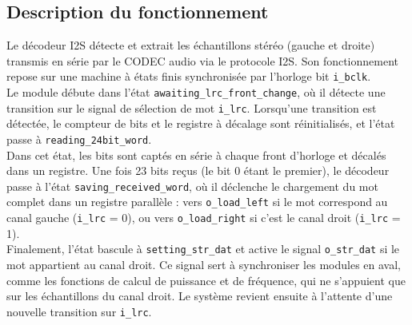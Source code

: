 


\subsection{Description du fonctionnement}

Le décodeur I2S détecte et extrait les échantillons stéréo (gauche et droite)
transmis en série par le CODEC audio via le protocole I2S. Son
fonctionnement repose sur une machine à états finis synchronisée par
l'horloge bit \verb|i_bclk|.\\

Le module débute dans l'état \verb|awaiting_lrc_front_change|, où il détecte
une transition sur le signal de sélection de mot \verb|i_lrc|. Lorsqu'une transition
est détectée, le compteur de bits et le registre à décalage sont réinitialisés,
et l'état passe à \verb|reading_24bit_word|.\\

Dans cet état, les bits sont captés en série à chaque front d'horloge et
décalés dans un registre. Une fois 23 bits reçus (le bit 0 étant le premier),
le décodeur passe à l'état \verb|saving_received_word|, où il déclenche le chargement
du mot complet dans un registre parallèle : vers \verb|o_load_left| si le mot
correspond au canal gauche (\verb|i_lrc| = 0), ou vers \verb|o_load_right| si
c'est le canal droit (\verb|i_lrc| = 1).\\

Finalement, l'état bascule à \verb|setting_str_dat| et active le signal \verb|o_str_dat| si le mot
appartient au canal droit. Ce signal sert à synchroniser les modules en aval,
comme les fonctions de calcul de puissance et de fréquence, qui ne s'appuient
que sur les échantillons du canal droit. Le système revient ensuite à l'attente
d'une nouvelle transition sur \verb|i_lrc|.


